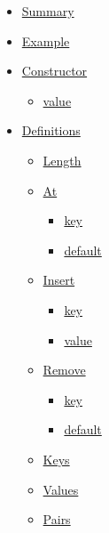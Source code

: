 \begin{itemize}
\tightlist
\item
  \hyperref[summary]{Summary}
\item
  \hyperref[example]{Example}
\item
  \hyperref[constructor]{Constructor}

  \begin{itemize}
  \tightlist
  \item
    \hyperref[constructor-value]{value}
  \end{itemize}
\item
  \hyperref[definitions]{Definitions}

  \begin{itemize}
  \tightlist
  \item
    \hyperref[definitions-len]{Length}
  \item
    \hyperref[definitions-at]{At}

    \begin{itemize}
    \tightlist
    \item
      \hyperref[definitions-at-key]{key}
    \item
      \hyperref[definitions-at-default]{default}
    \end{itemize}
  \item
    \hyperref[definitions-insert]{Insert}

    \begin{itemize}
    \tightlist
    \item
      \hyperref[definitions-insert-key]{key}
    \item
      \hyperref[definitions-insert-value]{value}
    \end{itemize}
  \item
    \hyperref[definitions-remove]{Remove}

    \begin{itemize}
    \tightlist
    \item
      \hyperref[definitions-remove-key]{key}
    \item
      \hyperref[definitions-remove-default]{default}
    \end{itemize}
  \item
    \hyperref[definitions-keys]{Keys}
  \item
    \hyperref[definitions-values]{Values}
  \item
    \hyperref[definitions-pairs]{Pairs}
  \end{itemize}
\end{itemize}


